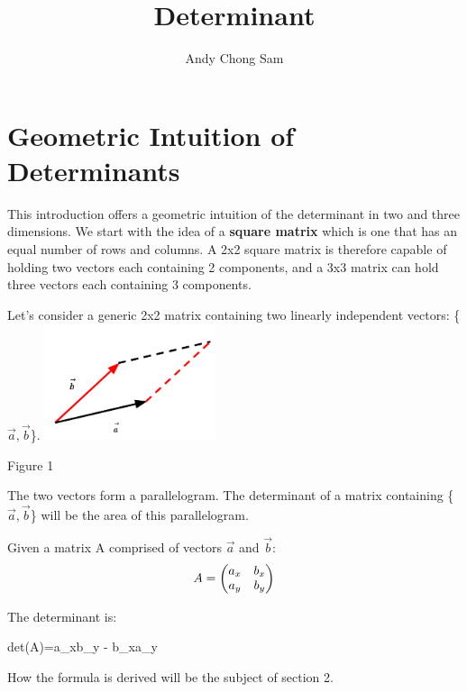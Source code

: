 \documentclass{article}
\begin{document}
	
	\title{Determinant}
	\author{Andy Chong Sam}
	
	\maketitle	
	
	\section{Geometric Intuition of Determinants}
	
	\par \noindent This introduction offers a geometric intuition of the determinant in two and three dimensions. We start with the idea of a \textbf{square matrix} which is one that has an equal number of rows and columns. A 2x2 square matrix is therefore capable of holding two vectors each containing 2 components, and a 3x3 matrix can hold three vectors each containing 3 components.
	\newline
	\newline
	\begin{minipage}[c]{.45\linewidth}
		\par \noindent Let's consider a generic 2x2 matrix containing two linearly independent vectors: \{\(\vec a, \vec b\)\}.
		\newline
		\includegraphics[width=5cm]{det-geo1.png}\newline
		\begin{center}Figure 1\end{center}
		\par \noindent The two vectors form a parallelogram. The determinant of a matrix containing \{\(\vec a, \vec b\)\} will be the area of this parallelogram.  
		\newline
		\par \noindent Given a matrix A comprised of vectors \(\vec a\) and \( \vec b\):
		\[A=
		\left(\begin{array}{@{}cc@{}}
			a_x & b_x \\ 
			a_y &  b_y \\
		\end{array}\right)
		\]
		\newline
		\par \noindent The determinant is:
		
		\begin{flalign*}
		 det(A)=a_xb_y - b_xa_y
		 \end{flalign*}
		\newline
		\par \noindent How the formula is derived will be the subject of section 2.
				
	\end{minipage}
\end{document}
